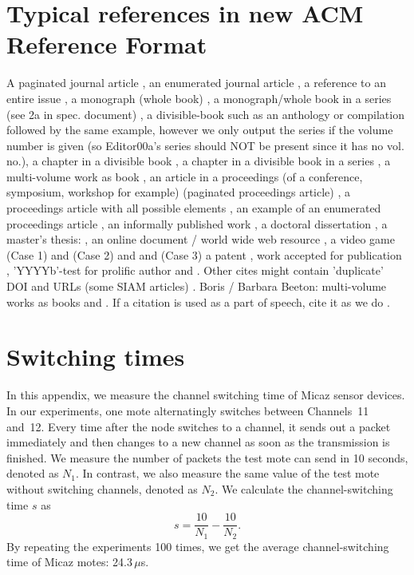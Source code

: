 \documentclass[format=acmsmall, review=false]{acmart}
\begin{document}
\section{Typical references in new ACM Reference Format}
A paginated journal article \cite{Abril07}, an enumerated
journal article \cite{Cohen07}, a reference to an entire issue \cite{JCohen96},
a monograph (whole book) \cite{Kosiur01}, a monograph/whole book in a series (see 2a in spec. document)
\cite{Harel79}, a divisible-book such as an anthology or compilation \cite{Editor00}
followed by the same example, however we only output the series if the volume number is given
\cite{Editor00a} (so Editor00a's series should NOT be present since it has no vol. no.),
a chapter in a divisible book \cite{Spector90}, a chapter in a divisible book
in a series \cite{Douglass98}, a multi-volume work as book \cite{Knuth97},
an article in a proceedings (of a conference, symposium, workshop for example)
(paginated proceedings article) \cite{Andler79}, a proceedings article
with all possible elements \cite{Smith10}, an example of an enumerated
proceedings article \cite{VanGundy07},
an informally published work \cite{Harel78}, a doctoral dissertation \cite{Clarkson85},
a master's thesis: \cite{anisi03}, an online document / world wide web
resource \cite{Thornburg01, Ablamowicz07, Poker06}, a video game (Case 1) \cite{Obama08} and (Case 2) \cite{Novak03}
and \cite{Lee05} and (Case 3) a patent \cite{JoeScientist001},
work accepted for publication \cite{rous08}, 'YYYYb'-test for prolific author
\cite{SaeediMEJ10} and \cite{SaeediJETC10}. Other cites might contain
'duplicate' DOI and URLs (some SIAM articles) \cite{Kirschmer:2010:AEI:1958016.1958018}.
Boris / Barbara Beeton: multi-volume works as books
\cite{MR781536} and \cite{MR781537}. If a citation is used as a part of speech, cite it as we do \citet{Abril07}.

\appendix
\section{Switching times}

In this appendix, we measure the channel switching time of Micaz
\cite{CROSSBOW} sensor devices.  In our experiments, one mote
alternatingly switches between Channels~11 and~12. Every time after
the node switches to a channel, it sends out a packet immediately and
then changes to a new channel as soon as the transmission is finished.
We measure the number of packets the test mote can send in 10 seconds,
denoted as $N_{1}$. In contrast, we also measure the same value of the
test mote without switching channels, denoted as $N_{2}$. We calculate
the channel-switching time $s$ as
\begin{displaymath}%
s=\frac{10}{N_{1}}-\frac{10}{N_{2}}.
\end{displaymath}%
By repeating the experiments 100 times, we get the average
channel-switching time of Micaz motes: 24.3\,$\mu$s.
\end{document}
